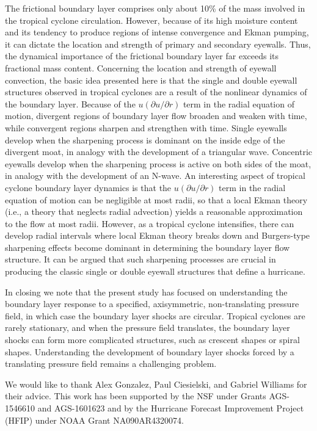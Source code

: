\documentclass[10pt]{article}
\begin{document}
    The frictional boundary layer comprises only about 10\% of the mass involved
in the tropical cyclone circulation. However, because of its high moisture content
and its tendency to produce regions of intense convergence and Ekman pumping, it
can dictate the location and strength of primary and secondary eyewalls. Thus,
the dynamical importance of the frictional boundary layer far exceeds its
fractional mass content. Concerning the location and strength of eyewall
convection, the basic idea presented here is that the single and double eyewall
structures observed in tropical cyclones are a result of the nonlinear
dynamics of the boundary layer. Because of the $u(\partial u/\partial r)$
term in the radial equation of motion, divergent regions of boundary layer
flow broaden and weaken with time, while convergent regions sharpen and
strengthen with time. Single eyewalls develop when the sharpening process
is dominant on the inside edge of the divergent moat, in analogy with the
development of a triangular wave. Concentric eyewalls develop when the
sharpening process is active on both sides of the moat, in analogy with
the development of an N-wave. An interesting aspect of tropical cyclone
boundary layer dynamics is that the $u(\partial u/\partial r)$ term in
the radial equation of motion can be negligible at most radii, so that
a local Ekman theory (i.e., a theory that neglects radial advection)
yields a reasonable approximation to the flow at most radii. However,
as a tropical cyclone intensifies, there can develop radial intervals
where local Ekman theory breaks down and Burgers-type sharpening effects
become dominant in determining the boundary layer flow structure. It can
be argued that such sharpening processes are crucial in producing the
classic single or double eyewall structures that define a hurricane.

    In closing we note that the present study has focused on understanding
the boundary layer response to a specified, axisymmetric, non-translating pressure
field, in which case the boundary layer shocks are circular. Tropical cyclones
are rarely stationary, and when the pressure field translates, the boundary
layer shocks can form more complicated structures, such as crescent shapes or
spiral shapes. Understanding the development of boundary layer shocks
forced by a translating pressure field remains a challenging problem.


\begin{acknowledgment}
     We would like to thank Alex Gonzalez, Paul Ciesielski, and Gabriel Williams
for their advice. This work has been supported by the NSF under Grants AGS-1546610
and AGS-1601623 and by the Hurricane Forecast Improvement Project (HFIP) under
NOAA Grant NA090AR4320074.
\end{acknowledgment}

{}
{\clearpage}


\end{document}
